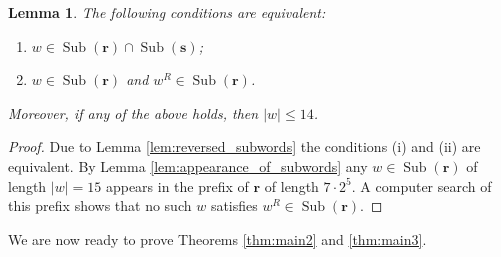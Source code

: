 \documentclass[a4paper,11pt]{amsart}
\newtheorem{lem}[thm]{Lemma}
\theoremstyle{definition}
\newcommand{\Sub}{\operatorname{Sub}}
\begin{document}
\begin{lem} \label{lem:common_subwords}
The following conditions are equivalent:
\begin{enumerate}[label={\textup{(\roman*)}}]
\item $w \in \Sub(\mathbf{r}) \cap \Sub(\mathbf{s})$;
\item $w \in \Sub(\mathbf{r})$ and $w^R \in \Sub(\mathbf{r})$.
\end{enumerate}
Moreover, if any of the above holds, then $|w| \leq 14$.
\end{lem}
\begin{proof}
Due to Lemma \ref{lem:reversed_subwords} the conditions (i) and (ii) are equivalent. By Lemma \ref{lem:appearance_of_subwords} any $w \in \Sub(\mathbf{r})$ of length $|w|=15$ appears in the prefix of $\mathbf{r}$ of length $7 \cdot 2^5$. A computer search of this prefix shows that no such $w$ satisfies $w^R \in \Sub(\mathbf{r})$.
\end{proof}

We are now ready to prove Theorems \ref{thm:main2} and \ref{thm:main3}.
\end{document}
